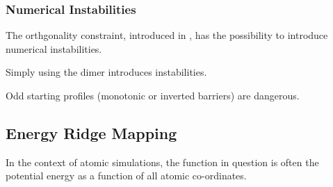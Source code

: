 \subsubsection{Numerical Instabilities}
\bit
\item The orthgonality constraint, introduced in , has the possibility to introduce numerical instabilities.
\item Simply using the dimer introduces instabilities.
\item Odd starting profiles (monotonic or inverted barriers) are dangerous.
\eit

\placeholder

\subsection{Energy Ridge Mapping}
\label{sec:energy-ridge-mapping}

In the context of atomic simulations, the function in question is often the potential energy as a function of all atomic co-ordinates.

\incomplete
